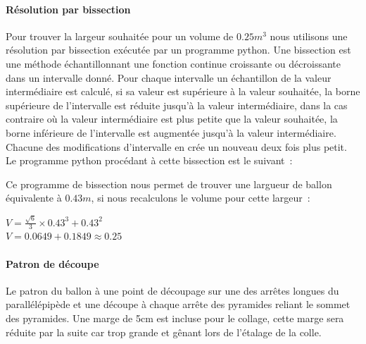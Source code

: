 \documentclass[a4paper,11pt]{article}
\begin{document}


\paragraph{Résolution par bissection}

Pour trouver la largeur souhaitée pour un volume de $0.25m^3$ nous utilisons une résolution par bissection exécutée par un programme python. Une bissection est une méthode échantillonnant une fonction continue croissante ou décroissante dans un intervalle donné. Pour chaque intervalle un échantillon de la valeur intermédiaire est calculé, si sa valeur est supérieure à la valeur souhaitée, la borne supérieure de l'intervalle est réduite jusqu'à la valeur intermédiaire, dans la cas contraire où la valeur intermédiaire est plus petite que la valeur souhaitée, la borne inférieure de l'intervalle est augmentée jusqu'à la valeur intermédiaire. Chacune des modifications d'intervalle en crée un nouveau deux fois plus petit.
\medbreak
Le programme python procédant à cette bissection est le suivant~:



Ce programme de bissection nous permet de trouver une largueur de ballon équivalente à $0.43m$, si nous recalculons le volume pour cette largeur~:

\begin{center}
  $\displaystyle{V = \frac{\sqrt{6}}{3} \times 0.43^3 + 0.43^2 }$ \\
	$\displaystyle{V = 0.0649 + 0.1849 \approx 0.25}$
\end{center}

\paragraph{Patron de découpe}

Le patron du ballon à une point de découpage sur une des arrêtes longues du parallélépipède et une découpe à chaque arrête des pyramides reliant le sommet des pyramides. Une marge de 5cm est incluse pour le collage, cette marge sera réduite par la suite car trop grande et gênant lors de l'étalage de la colle.
\end{document}
